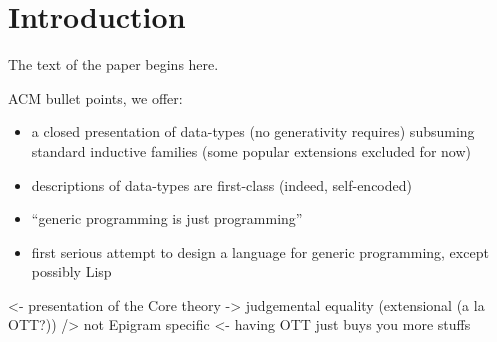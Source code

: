 \documentclass[preprint, authoryear]{sigplanconf}
\newenvironment{structure}{\footnotesize\verbatim}{\endverbatim}
\begin{document}
\newcommand{\RuleSide}[3]{\gap{\mbox{$#2$}} \hspace*{0.1in}               %
                            \Rule{#1}{#3}                          %
                          \hspace*{0.1in}\mbox{$#2$}}
\newcommand{\AxiomSide}[2]{\gap{\mbox{$#1$}} \hspace*{0.1in}              %
                             \Axiom{#2}                            %
                           \hspace*{0.1in}\mbox{$#1$}}
\newcommand{\RULE}[1]{\textbf{#1}}
\newcommand{\hg}{\hspace{0.2in}}



\section{Introduction}

The text of the paper begins here. \cite{morris:spf}

ACM bullet points, we offer:
\begin{itemize}
\item a closed presentation of data-types (no generativity requires)
  subsuming standard inductive families (some popular extensions
  excluded for now)
\item descriptions of data-types are first-class (indeed,
  self-encoded)
\item ``generic programming is just programming''
\item first serious attempt to design a language for generic
  programming, except possibly Lisp
\end{itemize}

\begin{structure}
<- presentation of the Core theory
    -> judgemental equality (extensional (a la OTT?))
    /> not Epigram specific 
        <- having OTT just buys you more stuffs
\end{structure}

\newcommand{\Valid}{\textsc{valid}}
\newcommand{\Set}{\textsc{Set}}
\newcommand{\Type}[1]{{#1}:\Set}
\newcommand{\x}{x}
\newcommand{\bnd}[2]{{#1}\!:\!{#2}}
\newcommand{\xS}{\bnd{x}{S}}
\newcommand{\stkl}[1]{\begin{array}[b]{@{}l@{}}#1\end{array}}
\newcommand{\stkc}[1]{\begin{array}[b]{@{}c@{}}#1\end{array}}
\newcommand{\pr}[2]{\left[{#1},{#2}\right]}
\end{document}
